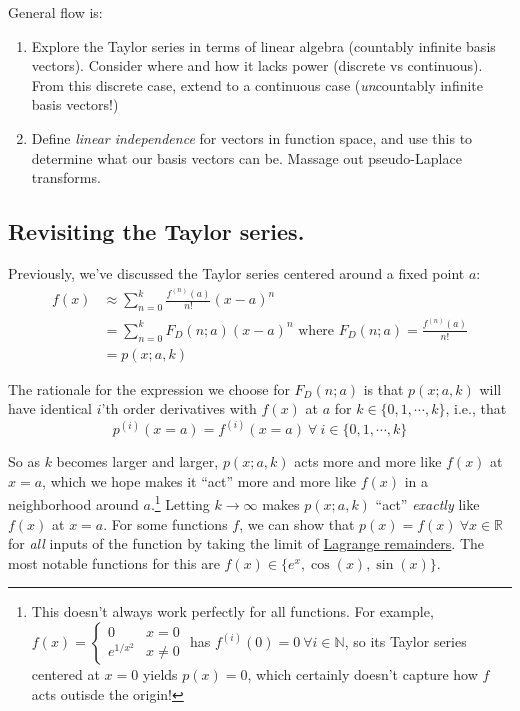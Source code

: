 \documentclass[letterpaper,12pt]{report}
\begin{document}




General flow is:

\begin{enumerate}
  \item
    Explore the Taylor series in terms of linear algebra (countably infinite basis vectors).
    Consider where and how it lacks power (discrete vs continuous).
    From this discrete case, extend to a continuous case
    (\emph{un}countably infinite basis vectors!)
  \item
    Define \emph{linear independence} for vectors in function space, 
    and use this to determine what our basis vectors can be.
    Massage out pseudo-Laplace transforms.

\end{enumerate}

\subsection{Revisiting the Taylor series.}

Previously, we've discussed the Taylor series centered around a fixed point \(a\):
\begin{equation}
\begin{split}
  f(x) &\approx \sum_{n=0}^{k}\frac{f^{(n)}(a)}{n!}(x-a)^n  \\
       &= \sum_{n=0}^{k}F_D(n; a) (x-a)^n \text{ where } F_D(n;a) = \frac{f^{(n)}(a)}{n!} \\
       &= p(x;a,k)
\end{split}
\end{equation}\label{equation:taylor-series}

The rationale for the expression we choose for \(F_D(n;a)\) 
is that \(p(x;a,k)\) will have identical \(i\)'th order derivatives with \(f(x)\) at \(a\)
for \(k \in \{0, 1, \cdots, k\}\), i.e., that
\[p^{(i)}(x=a) = f^{(i)}(x=a) \ \forall \ i \in \{0, 1, \cdots, k \}    \]

So as \(k\) becomes larger and larger, \(p(x;a,k)\) acts more and more like \(f(x)\)
at \(x=a\),
which we hope makes it ``act'' more and more like \(f(x)\)
in a neighborhood around \(a\).\footnote
{
  This doesn't always work perfectly for all functions. For example,
  \(f(x) = 
  \begin{cases}
    0 & x = 0 \\
    e^{1/x^2} & x \neq 0
  \end{cases}
  \)
  has \(f^{(i)}(0) = 0 \ \forall i \in \mathbb{N}\), 
  so its Taylor series centered at \(x=0\) yields \(p(x) = 0\),
  which certainly doesn't capture how \(f\) acts outisde the origin!
}
Letting \(k \rightarrow \infty\) makes \(p(x;a,k)\) ``act'' \emph{exactly}
like \(f(x)\) at \(x=a\).
For some functions \(f\), 
we can show that \(p(x) = f(x) \ \forall x\in \mathbb{R}\) for \emph{all} 
inputs of the function
by taking the limit of \href{https://math.stackexchange.com/a/2136695}{Lagrange remainders}.
The most notable functions for this are \(f(x) \in \{e^x,\cos(x),\sin(x)\}\).\par
\end{document}

